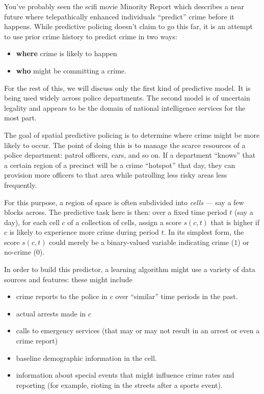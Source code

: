\documentclass[11pt]{paper}
\begin{document}
You've probably seen the scifi movie Minority Report which describes a
near future where telepathically enhanced individuals ``predict'' crime
before it happens. While predictive policing doesn't claim to go this
far, it is an attempt to use prior crime history to predict crime in two
ways:

\begin{itemize}
\itemsep1pt\parskip0pt
\item
  \textbf{where} crime is likely to happen
\item
  \textbf{who} might be committing a crime.
\end{itemize}

For the rest of this, we will discuss only the first kind of predictive
model. It is being used widely across police departments. The second
model is of uncertain legality and appears to be the domain of national
intelligence services for the most part.

The goal of spatial predictive policing is to determine where crime
might be more likely to occur. The point of doing this is to manage the
scarce resources of a police department: patrol officers, cars, and so
on. If a department ``knows'' that a certain region of a precinct will
be a crime ``hotspot'' that day, they can provision more officers to
that area while patrolling less risky areas less frequently.

For this purpose, a region of space is often subdivided into
\emph{cells} --- say a few blocks across. The predictive task here is
then: over a fixed time period $t$ (say a day), for each cell $c$ of a
collection of cells, assign a score $s(c, t)$ that is higher if $c$ is
likely to experience more crime during period $t$. In its simplest form,
the score $s(c, t)$ could merely be a binary-valued variable indicating
crime ($1$) or no-crime ($0$).

In order to build this predictor, a learning algorithm might use a
variety of data sources and features: these might include

\begin{itemize}
\itemsep1pt\parskip0pt
\item
  crime reports to the police in $c$ over ``similar'' time periods in
  the past.
\item
  actual arrests made in $c$
\item
  calls to emergency services (that may or may not result in an arrest
  or even a crime report)
\item
  baseline demographic information in the cell.
\item
  information about special events that might influence crime rates and
  reporting (for example, rioting in the streets after a sports event).
\end{itemize}
\end{document}
